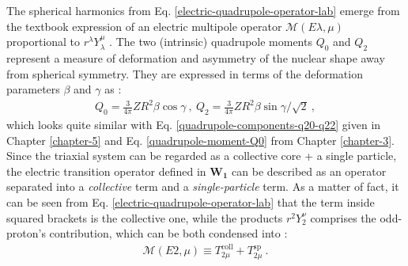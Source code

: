 The spherical harmonics from Eq. \ref{electric-quadrupole-operator-lab} emerge from the textbook expression of an electric multipole operator $\mathcal{M}(E\lambda,\mu)$ proportional to $r^\lambda Y_\lambda^\mu$  \cite{heyde1994nuclear}. The two (intrinsic) quadrupole moments $Q_{0}$ and $Q_{2}$ represent a measure of deformation and asymmetry of the nuclear shape away from spherical symmetry. They are expressed in terms of the deformation parameters $\beta$ and $\gamma$ as \cite{raduta2018wobbling}:
\begin{align}
    Q_{0}=\frac{3}{4\pi}ZR^2\beta\cos\gamma\ ,\ Q_{2}=\frac{3}{4\pi}ZR^2\beta\sin\gamma/\sqrt{2}\ ,
    \label{quadrupole-components-Q0-Q2}
\end{align}
which looks quite similar with Eq. \ref{quadrupole-components-q20-q22} given in Chapter \ref{chapter-5} and Eq. \ref{quadrupole-moment-Q0} from Chapter \ref{chapter-3}. Since the triaxial system can be regarded as a collective core + a single particle, the electric transition operator defined in $\mathbf{W_1}$ can be described as an operator separated into a \emph{collective} term and a \emph{single-particle} term. As a matter of fact, it can be seen from Eq. \ref{electric-quadrupole-operator-lab} that the term inside squared brackets is the collective one, while the products $r^2Y_2^\nu$ comprises the odd-proton's contribution, which can be both condensed into \cite{raduta2020approach}:
\begin{align}
    \mathcal{M}(E2,\mu)\equiv T_{2\mu}^\text{coll}+T_{2\mu}^\text{sp}\ .
    \label{quadrupole-transition-operator-terms}
\end{align}

